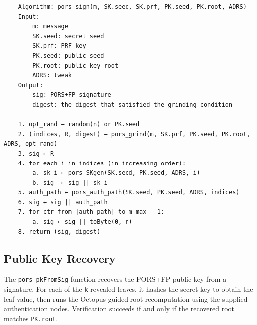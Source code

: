 \begin{verbatim}
    Algorithm: pors_sign(m, SK.seed, SK.prf, PK.seed, PK.root, ADRS)
    Input:
        m: message
        SK.seed: secret seed
        SK.prf: PRF key
        PK.seed: public seed
        PK.root: public key root
        ADRS: tweak
    Output:
        sig: PORS+FP signature
        digest: the digest that satisfied the grinding condition

    1. opt_rand ← random(n) or PK.seed
    2. (indices, R, digest) ← pors_grind(m, SK.prf, PK.seed, PK.root, ADRS, opt_rand)
    3. sig ← R
    4. for each i in indices (in increasing order):
        a. sk_i ← pors_SKgen(SK.seed, PK.seed, ADRS, i)
        b. sig  ← sig || sk_i
    5. auth_path ← pors_auth_path(SK.seed, PK.seed, ADRS, indices)
    6. sig ← sig || auth_path
    7. for ctr from |auth_path| to m_max - 1:
        a. sig ← sig || toByte(0, n)
    8. return (sig, digest)
\end{verbatim} 

\subsection{Public Key Recovery}
The \texttt{pors\_pkFromSig} function recovers the PORS+FP public key from a signature. 
For each of the \texttt{k} revealed leaves, it hashes the secret key to obtain the leaf value, then runs the Octopus-guided root recomputation using the supplied authentication nodes. 
Verification succeeds if and only if the recovered root matches \texttt{PK.root}.

